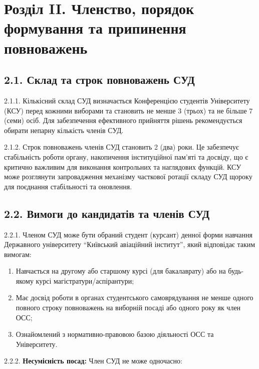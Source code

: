 \section*{Розділ II. Членство, порядок формування та припинення повноважень}

\subsection*{2.1. Склад та строк повноважень СУД}
    2.1.1. Кількісний склад СУД визначається Конференцією студентів Університету (КСУ) перед кожними виборами та становить не менше 3 (трьох) та не більше 7 (семи) осіб. Для забезпечення ефективного прийняття рішень рекомендується обирати непарну кількість членів СУД.

    2.1.2. Строк повноважень членів СУД становить 2 (два) роки. Це забезпечує стабільність роботи органу, накопичення інституційної пам'яті та досвіду, що є критично важливим для виконання контрольних та наглядових функцій. КСУ може розглянути запровадження механізму часткової ротації складу СУД щороку для поєднання стабільності та оновлення.

\subsection*{2.2. Вимоги до кандидатів та членів СУД}
    2.2.1. Членом СУД може бути обраний студент (курсант) денної форми навчання Державного університету ``Київський авіаційний інститут'', який відповідає таким вимогам:

        \begin{enumerate}[label=\alph*)]
            \item Навчається на другому або старшому курсі (для бакалаврату) або на будь-якому курсі магістратури/аспірантури;
            \item Має досвід роботи в органах студентського самоврядування не менше одного повного строку повноважень на виборній посаді або одного року як член ОСС;
            \item Ознайомлений з нормативно-правовою базою діяльності ОСС та Університету.
        \end{enumerate}

    2.2.2. \textbf{Несумісність посад:} Член СУД не може одночасно:

